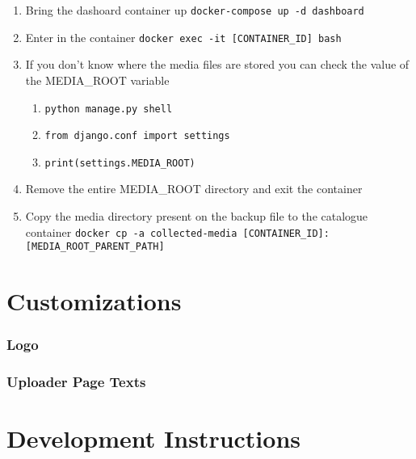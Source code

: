 \documentclass[
]{book}
\begin{document}
\begin{enumerate}
\begin{enumerate}
    \begin{enumerate}
    \def\labelenumiii{\arabic{enumiii}.}
    \item
      Bring the dashoard container up \texttt{docker-compose\ up\ -d\ dashboard}
    \item
      Enter in the container \texttt{docker\ exec\ -it\ {[}CONTAINER\_ID{]}\ bash}
    \item
      If you don't know where the media files are stored you can check the value of the MEDIA\_ROOT variable

      \begin{enumerate}
      \def\labelenumiv{\arabic{enumiv}.}
      \item
        \texttt{python\ manage.py\ shell}
      \item
        \texttt{from\ django.conf\ import\ settings}
      \item
        \texttt{print(settings.MEDIA\_ROOT)}
      \end{enumerate}
    \item
      Remove the entire MEDIA\_ROOT directory and exit the container
    \item
      Copy the media directory present on the backup file to the catalogue container \texttt{docker\ cp\ -a\ collected-media\ {[}CONTAINER\_ID{]}:{[}MEDIA\_ROOT\_PARENT\_PATH{]}}
    \end{enumerate}
  \end{enumerate}
\end{enumerate}

\hypertarget{customizations}{%
\chapter{Customizations}\label{customizations}}

\hypertarget{logo}{%
\subsection*{Logo}\label{logo}}

\hypertarget{uploader-page-texts}{%
\subsection*{Uploader Page Texts}\label{uploader-page-texts}}

\hypertarget{development-instructions}{%
\chapter{Development Instructions}\label{development-instructions}}
\end{document}
